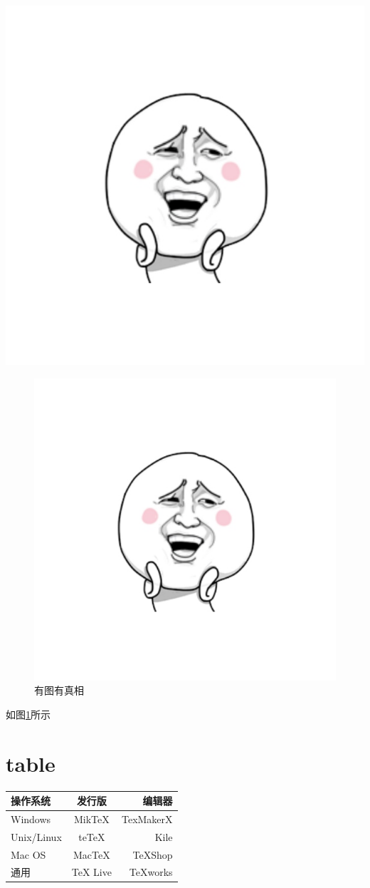 \documentclass[UTF8]{ctexart}
\begin{document}
\includegraphics[width = .8\textwidth]{a.png}

\begin{figure}[htbp]
\centering
\includegraphics[width = .8\textwidth]{a.png}
\caption{有图有真相}
\label{a}
\end{figure}

如图\ref{a}所示

\section{table}

\begin{tabular}{|l|c|r|}
 \hline
操作系统& 发行版& 编辑器\\
 \hline
Windows & MikTeX & TexMakerX \\
 \hline
Unix/Linux & teTeX & Kile \\
 \hline
Mac OS & MacTeX & TeXShop \\
 \hline
通用& TeX Live & TeXworks \\
 \hline
\end{tabular}
\end{document}

